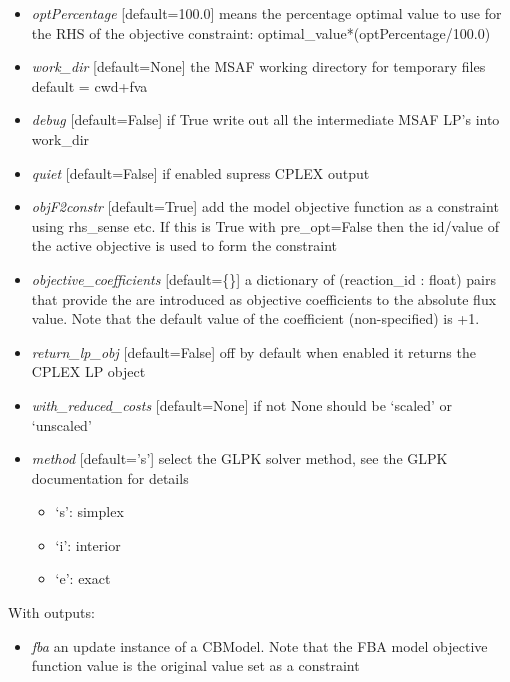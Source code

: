 \documentclass[a4paper,11pt,english]{sphinxmanual}
\begin{document}
\begin{fulllineitems}
\begin{itemize}
\item {} 
\emph{optPercentage} {[}default=100.0{]} means the percentage optimal value to use for the RHS of the objective constraint: optimal\_value*(optPercentage/100.0)

\item {} 
\emph{work\_dir} {[}default=None{]} the MSAF working directory for temporary files default = cwd+fva

\item {} 
\emph{debug} {[}default=False{]} if True write out all the intermediate MSAF LP's into work\_dir

\item {} 
\emph{quiet} {[}default=False{]} if enabled supress CPLEX output

\item {} 
\emph{objF2constr} {[}default=True{]} add the model objective function as a constraint using rhs\_sense etc. If
this is True with pre\_opt=False then the id/value of the active objective is used to form the constraint

\item {} 
\emph{objective\_coefficients} {[}default=\{\}{]} a dictionary of (reaction\_id : float) pairs that provide the are introduced as objective coefficients to the absolute flux value. Note that the default value of the coefficient (non-specified) is +1.

\item {} 
\emph{return\_lp\_obj} {[}default=False{]} off by default when enabled it returns the CPLEX LP object

\item {} 
\emph{with\_reduced\_costs} {[}default=None{]} if not None should be `scaled' or `unscaled'

\item {} 
\emph{method} {[}default='s'{]} select the GLPK solver method, see the GLPK documentation for details
\begin{itemize}
\item {} 
`s': simplex

\item {} 
`i': interior

\item {} 
`e': exact

\end{itemize}

\end{itemize}

With outputs:
\begin{itemize}
\item {} 
\emph{fba} an update instance of a CBModel. Note that the FBA model objective function value is the original value set as a constraint

\end{itemize}

\end{fulllineitems}
\end{document}
